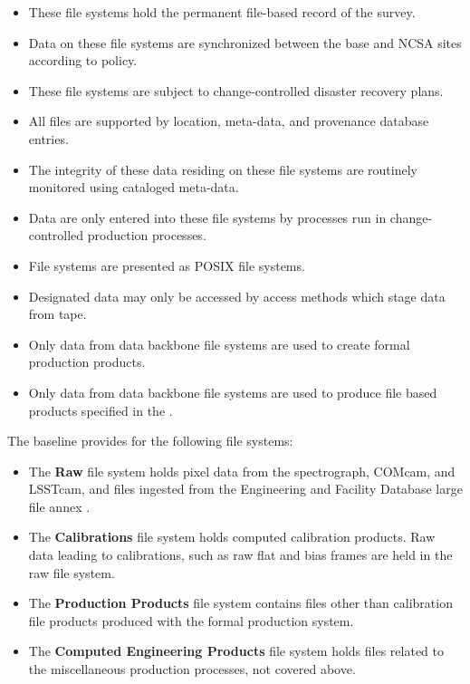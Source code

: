 \documentclass[toc,DM,lsstdraft]{lsstdoc}
\begin{document}
\begin{itemize}
\item
  These file systems hold the permanent file-based record of the survey.
\item
  Data on these file systems are synchronized between the base and NCSA
  sites according to policy.
\item
  These file systems are subject to change-controlled disaster recovery
  plans.
\item
  All files are supported by location, meta-data, and provenance
  database entries.
\item
  The integrity of these data residing on these file systems are
  routinely monitored using cataloged meta-data.
\item
  Data are only entered into these file systems by processes run in
  change-controlled production processes.
\item
  File systems are presented as POSIX file systems.
\item
  Designated data may only be accessed by access methods which stage
  data from tape.
\item
  Only data from data backbone file systems are used to create formal
  production products.
\item
  Only data from data backbone file systems are used to produce file based
  products specified in the \DPDD.
\end{itemize}

The baseline provides for the following file systems:

\begin{itemize}
\item The \textbf{Raw} file system holds pixel data from the spectrograph,
COMcam, and LSSTcam, and files ingested from the Engineering and Facility
Database large file annex .

\item The \textbf{Calibrations} file system holds computed calibration
products. Raw data leading to calibrations, such as raw flat and bias
frames are held in the raw file system.

\item The \textbf{Production Products} file system contains files other than
calibration file products produced with the formal production system.

\item The \textbf{Computed Engineering Products} file system holds files
related to the miscellaneous production processes, not covered above.
\end{itemize}


\end{document}
